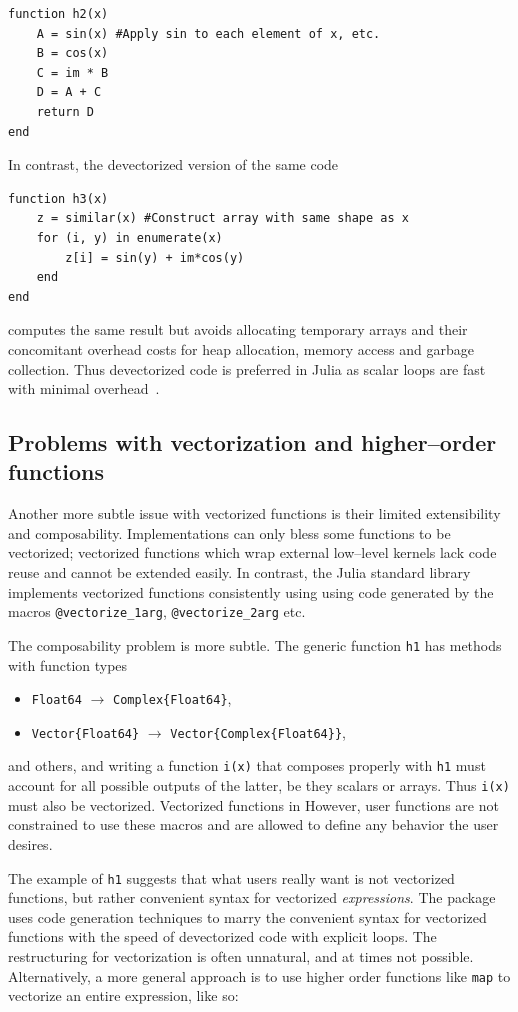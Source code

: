 \documentclass[pldi]{sigplanconf-pldi15}
\begin{document}
\begin{lstlisting}
function h2(x)
    A = sin(x) #Apply sin to each element of x, etc.
    B = cos(x)
    C = im * B
    D = A + C
    return D
end
\end{lstlisting}
%
In contrast, the devectorized version of the same code

\begin{lstlisting}
function h3(x)
    z = similar(x) #Construct array with same shape as x
    for (i, y) in enumerate(x)
        z[i] = sin(y) + im*cos(y)
    end
end
\end{lstlisting}
%
computes the same result but avoids allocating temporary arrays and their
concomitant overhead costs for heap allocation, memory access and garbage
collection. Thus devectorized code is preferred in Julia as scalar loops are
fast with minimal overhead~\cite{Bezanson2014b}. 


\subsection{Problems with vectorization and higher--order functions}

Another more subtle issue with vectorized functions is their limited
extensibility and composability. Implementations can only bless some
functions to be vectorized; vectorized functions which wrap external low--level
kernels lack code reuse and cannot be extended easily. In contrast, the Julia
standard library implements vectorized functions consistently using using code
generated by the macros \verb|@vectorize_1arg|, \verb|@vectorize_2arg| etc.

The composability problem is more subtle. The generic function \verb|h1| has
methods with function types

\begin{itemize}
	\item \verb|Float64| $\rightarrow$ \verb|Complex{Float64}|,
	\item \verb|Vector{Float64}| $\rightarrow$ \verb|Vector{Complex{Float64}}|,
\end{itemize}
%
and others, and writing a function \verb|i(x)| that composes properly with
\verb|h1| must account for all possible outputs of the latter, be they scalars
or arrays. Thus \verb|i(x)| must also be vectorized. Vectorized functions in
However, user functions are not constrained to use these macros and are allowed
to define any behavior the user desires.

The example of \verb|h1| suggests that what users really want is not vectorized
functions, but rather convenient syntax for vectorized \textit{expressions}.
The  package uses code generation techniques to marry
the convenient syntax for vectorized functions with the speed of devectorized
code with explicit loops. The restructuring for vectorization is often
unnatural, and at times not possible. Alternatively, a more general approach is
to use higher order functions like \verb|map| to vectorize an entire
expression, like so:
\end{document}
